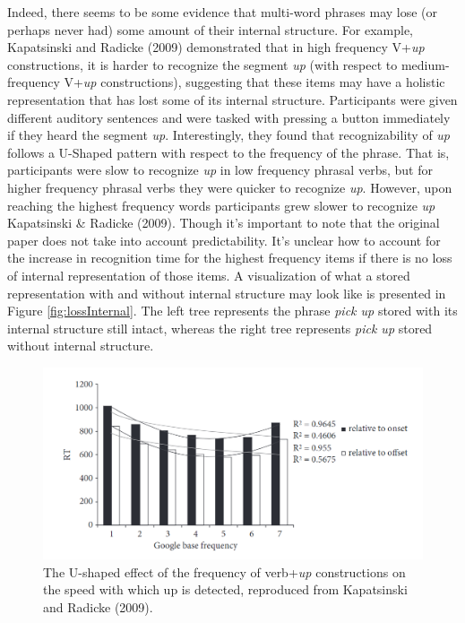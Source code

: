 \documentclass[
  man,floatsintext]{apa6}
\begin{document}
Indeed, there seems to be some evidence that multi-word phrases may lose (or perhaps never had) some amount of their internal structure. For example, Kapatsinski and Radicke (2009) demonstrated that in high frequency V+\emph{up} constructions, it is harder to recognize the segment \emph{up} (with respect to medium-frequency V+\emph{up} constructions), suggesting that these items may have a holistic representation that has lost some of its internal structure. Participants were given different auditory sentences and were tasked with pressing a button immediately if they heard the segment \emph{up}. Interestingly, they found that recognizability of \emph{up} follows a U-Shaped pattern with respect to the frequency of the phrase. That is, participants were slow to recognize \emph{up} in low frequency phrasal verbs, but for higher frequency phrasal verbs they were quicker to recognize \emph{up}. However, upon reaching the highest frequency words participants grew slower to recognize \emph{up} Kapatsinski \& Radicke (2009). Though it's important to note that the original paper does not take into account predictability. It's unclear how to account for the increase in recognition time for the highest frequency items if there is no loss of internal representation of those items. A visualization of what a stored representation with and without internal structure may look like is presented in Figure \ref{fig:lossInternal}. The left tree represents the phrase \emph{pick up} stored with its internal structure still intact, whereas the right tree represents \emph{pick up} stored without internal structure.



\begin{figure}

{\centering \includegraphics[width=0.7\linewidth]{Figures/kapatsinskiradicke_graph} 

}

\caption{The U-shaped effect of the frequency of verb+\emph{up} constructions on the speed with which up is detected, reproduced from Kapatsinski and Radicke (2009).}\label{fig:kapatsinskiplot}
\end{figure}
\end{document}
